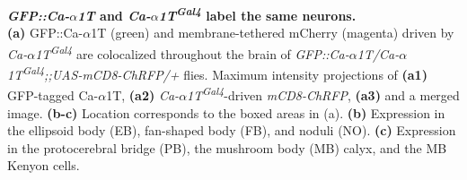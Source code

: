 \label{fig:S2}
\textbf{\emph{GFP::Ca-$\alpha$1T} and \emph{Ca-$\alpha$1T\textsuperscript{Gal4}} label the same neurons.}
\\
\textbf{(a)} GFP::Ca-$\alpha$1T (green) and membrane-tethered mCherry (magenta) driven by \emph{Ca-$\alpha$1T\textsuperscript{Gal4}} are colocalized throughout the brain of \emph{GFP::Ca-$\alpha$1T/Ca-$\alpha$1T\textsuperscript{Gal4};;UAS-mCD8-ChRFP/+} flies.
Maximum intensity projections of \textbf{(a1)} GFP-tagged Ca-$\alpha$1T, \textbf{(a2)} \emph{Ca-$\alpha$1T\textsuperscript{Gal4}}-driven \emph{mCD8-ChRFP}, \textbf{(a3)} and a merged image.
\textbf{(b-c)} Location corresponds to the boxed areas in (a).
\textbf{(b)} Expression in the ellipsoid body (EB), fan-shaped body (FB), and noduli (NO).
\textbf{(c)} Expression in the protocerebral bridge (PB), the mushroom body (MB) calyx, and the MB Kenyon cells.
